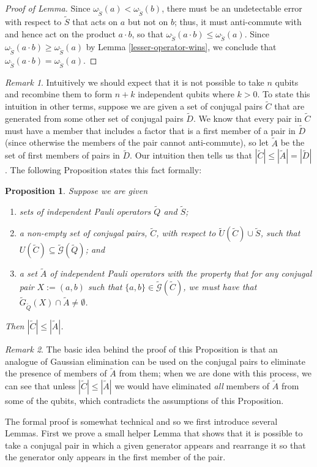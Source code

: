 \documentclass[12pt]{amsbook}
\theoremstyle{plain}
\newtheorem{proposition}{Proposition}
\theoremstyle{definition}
\theoremstyle{remark}
\newtheorem{remark}{Remark}
\newcommand{\set}{\tilde}
\newcommand{\genfun}{\tilde{\mathcal{G}}}
\newcommand{\om}{\omega}
\begin{document}
\begin{proof}[Proof of Lemma]
Since $\om_{\set S}(a)<\om_{\set S}(b)$, there must be an undetectable error with respect to $\set S$ that acts on $a$ but not on $b$;  thus, it must anti-commute with and hence act on the product $a\cdot b$, so that $\om_{\set S}(a\cdot b)\le \om_{\set S}(a)$.  Since $\om_{\set S}(a\cdot b)\ge \om_{\set S}(a)$ by Lemma \ref{lesser-operator-wins}, we conclude that $\om_{\set S}(a\cdot b) = \om_{\set S}(a)$.
\end{proof}
\begin{remark}
Intuitively we should expect that it is not possible to take $n$ qubits and recombine them to form $n+k$ independent qubits where $k>0$.  To state this intuition in other terms, suppose we are given a set of conjugal pairs $\set C$ that are generated from some other set of conjugal pairs $\set D$.  We know that every pair in $\set C$ must have a member that includes a factor that is a first member of a pair in $\set D$ (since otherwise the members of the pair cannot anti-commute), so let $\set A$ be the set of first members of pairs in $\set D$.  Our intuition then tells us that $|\set C|\le |\set A|=|\set D|$.  The following Proposition states this fact formally:
\end{remark}
\begin{proposition}
\label{bound-on-recombinations}
Suppose we are given
\begin{enumerate}
\item sets of independent Pauli operators $\set Q$ and $\set S$;
\item a non-empty set of conjugal pairs, $\set C$, with respect to $\set U(\set C) \cup \set S$, such that $U(\set C)\subseteq \genfun(\set Q)$; and
\item a set $\set A$ of independent Pauli operators with the property that for any conjugal pair $X:=(a,b)$ such that $\{a,b\}\in\genfun(\set C)$, we must have that $\set G_{\set Q}(X) \cap \set A \ne \emptyset$.
\end{enumerate}
Then $|\set C|\le|\set A|$.
\end{proposition}
\begin{remark}
The basic idea behind the proof of this Proposition is that an analogue of Gaussian elimination can be used on the conjugal pairs to eliminate the presence of members of $\set A$ from them;  when we are done with this process, we can see that unless $|\set C|\le |\set A|$ we would have eliminated \emph{all} members of $\set A$ from some of the qubits, which contradicts the assumptions of this Proposition.

The formal proof is somewhat technical and so we first introduce several Lemmas.  First we prove a small helper Lemma that shows that it is possible to take a conjugal pair in which a given generator appears and rearrange it so that the generator only appears in the first member of the pair.
\end{remark}
\end{document}

